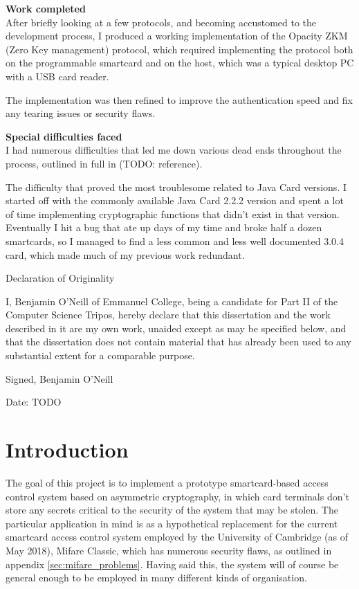 \documentclass[12pt,a4paper]{article}
\begin{document}
\vspace{0.3in}
{\large\bf Work completed}\\
After briefly looking at a few protocols, and becoming accustomed to the development process, I produced a working implementation of the Opacity ZKM (Zero Key management) protocol, which required implementing the protocol both on the programmable smartcard and on the host, which was a typical desktop PC with a USB card reader. 

The implementation was then refined to improve the authentication speed and fix any tearing issues or security flaws.

\vspace{0.3in}
{\large\bf Special difficulties faced}\\

I had numerous difficulties that led me down various dead ends throughout the process, outlined in full in (TODO: reference).

The difficulty that proved the most troublesome related to Java Card versions. I started off with the commonly available Java Card 2.2.2 version and spent a lot of time implementing cryptographic functions that didn't exist in that version. Eventually I hit a bug that ate up days of my time and broke half a dozen smartcards, so I managed to find a less common and less well documented 3.0.4 card, which made much of my previous work redundant.


\pagebreak

\centerline{\Large Declaration of Originality}
I, Benjamin O'Neill of Emmanuel College, being a candidate for Part II of the Computer Science Tripos, hereby declare that this dissertation and the work described in it are my own work, unaided except as may be specified below, and that the dissertation does not contain material that has already been used to any substantial extent for a comparable purpose.

Signed, Benjamin O'Neill

\vspace{0.2in}
Date: TODO
\pagebreak

\tableofcontents
\pagebreak

\section{Introduction}
The goal of this project is to implement a prototype smartcard-based access control system based on asymmetric cryptography, in which card terminals don't store any secrets critical to the security of the system that may be stolen. The particular application in mind is as a hypothetical replacement for the current smartcard access control system employed by the University of Cambridge (as of May 2018), Mifare Classic, which has numerous security flaws, as outlined in appendix \ref{sec:mifare_problems}. Having said this, the system will of course be general enough to be employed in many different kinds of organisation.
\end{document}
